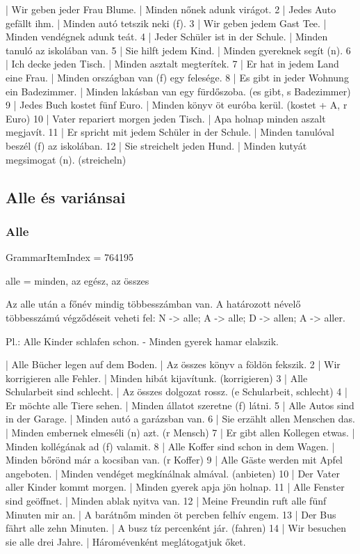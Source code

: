 \documentclass{article}
\newenvironment{desc}{\verbatim}{\endverbatim}
\newenvironment{exmp}{\verbatim}{\endverbatim}
\begin{document}
\begin{exmp}
1 | Wir geben jeder Frau Blume. | Minden nőnek adunk virágot.
2 | Jedes Auto gefällt ihm. | Minden autó tetszik neki (f).
3 | Wir geben jedem Gast Tee. | Minden vendégnek adunk teát.
4 | Jeder Schüler ist in der Schule. | Minden tanuló az iskolában van.
5 | Sie hilft jedem Kind. | Minden gyereknek segít (n).
6 | Ich decke jeden Tisch. | Minden asztalt megterítek.
7 | Er hat in jedem Land eine Frau. | Minden országban van (f) egy felesége.
8 | Es gibt in jeder Wohnung ein Badezimmer. | Minden lakásban van egy fürdőszoba. (es gibt, s Badezimmer)
9 | Jedes Buch kostet fünf Euro. | Minden könyv öt euróba kerül. (kostet + A, r Euro)
10 | Vater repariert morgen jeden Tisch. | Apa holnap minden aszalt megjavít.
11 | Er spricht mit jedem Schüler in der Schule. | Minden tanulóval beszél (f) az iskolában.
12 | Sie streichelt jeden Hund. | Minden kutyát megsimogat (n). (streicheln)
\end{exmp}

\subsection{Alle és variánsai}

\subsubsection{Alle}

GrammarItemIndex = 764195

\begin{desc}
alle = minden, az egész, az összes

Az alle után a főnév mindig többesszámban van. A határozott névelő többesszámú végződéseit veheti fel:
N -> alle;
A -> alle;
D -> allen;
A -> aller.

Pl.: Alle Kinder schlafen schon. - Minden gyerek hamar elalszik.
\end{desc}

\begin{exmp}
1 | Alle Bücher legen auf dem Boden. | Az összes könyv a földön fekszik.
2 | Wir korrigieren alle Fehler. | Minden hibát kijavítunk. (korrigieren)
3 | Alle Schularbeit sind schlecht. | Az összes dolgozat rossz. (e Schularbeit, schlecht)
4 | Er möchte alle Tiere sehen. | Minden állatot szeretne (f) látni.
5 | Alle Autos sind in der Garage. | Minden autó a garázsban van.
6 | Sie erzählt allen Menschen das. | Minden embernek elmeséli (n) azt. (r Mensch)
7 | Er gibt allen Kollegen etwas. | Minden kollégának ad (f) valamit.
8 | Alle Koffer sind schon in dem Wagen. | Minden bőrönd már a kocsiban van. (r Koffer)
9 | Alle Gäste werden mit Apfel angeboten. | Minden vendéget megkínálnak almával. (anbieten)
10 | Der Vater aller Kinder kommt morgen. | Minden gyerek apja jön holnap.
11 | Alle Fenster sind geöffnet. | Minden ablak nyitva van.
12 | Meine Freundin ruft alle fünf Minuten mir an. | A barátnőm minden öt percben felhív engem.
13 | Der Bus fährt alle zehn Minuten. | A busz tíz percenként jár. (fahren)
14 | Wir besuchen sie alle drei Jahre. | Háromévenként meglátogatjuk őket.
\end{exmp}
\end{document}
